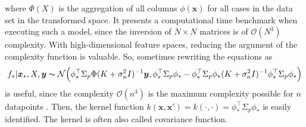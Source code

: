 where $\Phi(X)$ is the aggregation of all columns $\phi(\bm{x})$ for all cases in the data set in the transformed space. It presents a computational time benchmark when executing such a model, since the inversion of $N\times N$ matrices is of $\mathcal{O}(N^3)$ complexity. With high-dimensional feature spaces, reducing the argument of the complexity function is valuable. So, sometimes rewriting the equations as
\begin{equation}%
	f_*|\bm{x}_*,X,\bm{y} \thicksim \mathcal{N}\Big( \phi_*^{\top}\Sigma_p\Phi(K+ \sigma_n^2 I)^{-1}\bm{y}, \phi_*^{\top} \Sigma_p \phi_* - \phi_*^{\top} \Sigma_p \phi_*(K+ \sigma_n^2 I)^{-1}\phi_*^{\top} \Sigma_p \phi_* \Big)
\label{Rewritten Feature Space Gaussian Process evaluated in data space.}
\end{equation}
is useful, since the complexity $\mathcal{O}(n^3)$ is the maximum complexity possible for $n$ datapoints \cite{Rasmussen_06}. Then, the kernel function $k(\bm{x},\bm{x'}) = k(\cdot , \cdot) = \phi_*^{\top} \Sigma_p \phi_*$ is easily identified. The kernel is often also called covariance function. \newline

